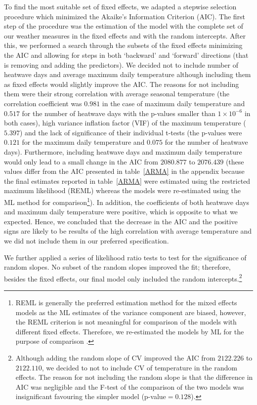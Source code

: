 \documentclass[12pt]{iopart}
\begin{document}
To find the most suitable set of fixed effects, we adapted a stepwise selection procedure which minimized the Akaike's Information Criterion (AIC). The first step of the procedure was the estimation of the model with the complete set of our weather measures in the fixed effects and with the random intercepts. After this, we performed a search through the subsets of the fixed effects minimizing the AIC and allowing for steps in both `backward' and `forward' directions (that is removing and adding the predictors). We decided not to include number of heatwave days and average maximum daily temperature although including them as fixed effects would slightly improve the AIC. The reasons for not including them were their strong correlation with average seasonal temperature (the correlation coefficient was $0.981$ in the case of maximum daily temperature and $0.517$ for the number of heatwave days with the p-values smaller than $1\times10^{-6}$ in both cases), high variance inflation factor (VIF) of the maximum temperature ($5.397$) and the lack of significance of their individual t-tests (the p-values were $0.121$ for the maximum daily temperature and $0.075$ for the number of heatwave days). Furthermore, including heatwave days and maximum daily temperature would only lead to a small change in the AIC from $2080.877$ to $2076.439$ (these values differ from the AIC presented in table~\ref{ARMA} in the appendix because the final estimates reported in table~\ref{ARMA} were estimated using the restricted maximum likelihood (REML) whereas the models were re-estimated using the ML method for comparison\footnote{REML is generally the preferred estimation method for the mixed effects models as the ML estimates of the variance component are biased, however, the REML criterion is not meaningful for comparison of the models with different fixed effects. Therefore, we re-estimated the models by ML for the purpose of comparison \cite{Zuur2009}.}). In addition, the coefficients of both heatwave days and maximum daily temperature were positive, which is opposite to what we expected. Hence, we concluded that the decrease in the AIC and the positive signs are likely to be results of the high correlation with average temperature and we did not include them in our preferred specification.

We further applied a series of likelihood ratio tests to test for the significance of random slopes. No subset of the random slopes improved the fit; therefore, besides the fixed effects, our final model only included the random intercepts.\footnote{Although adding the random slope of CV improved the AIC from $2122.226$ to $2122.110$, we decided to not to include CV of temperature in the random effects. The reason for not including the random slope is that the difference in AIC was negligible and the F-test of the comparison of the two models was insignificant favouring the simpler model (p-value$=0.128$).} 
\end{document}
